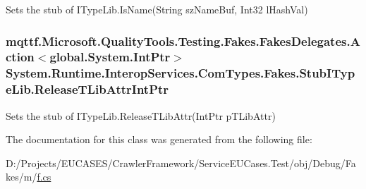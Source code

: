 Sets the stub of I\-Type\-Lib.\-Is\-Name(\-String sz\-Name\-Buf, Int32 l\-Hash\-Val)

\hypertarget{class_system_1_1_runtime_1_1_interop_services_1_1_com_types_1_1_fakes_1_1_stub_i_type_lib_a2ecc6b37cc0929152228151013834f4c}{
\subsubsection[{Release\-T\-Lib\-Attr\-Int\-Ptr}]{\setlength{\rightskip}{0pt plus 5cm}mqttf.\-Microsoft.\-Quality\-Tools.\-Testing.\-Fakes.\-Fakes\-Delegates.\-Action$<$global.\-System.\-Int\-Ptr$>$ System.\-Runtime.\-Interop\-Services.\-Com\-Types.\-Fakes.\-Stub\-I\-Type\-Lib.\-Release\-T\-Lib\-Attr\-Int\-Ptr}}\label{class_system_1_1_runtime_1_1_interop_services_1_1_com_types_1_1_fakes_1_1_stub_i_type_lib_a2ecc6b37cc0929152228151013834f4c}


Sets the stub of I\-Type\-Lib.\-Release\-T\-Lib\-Attr(\-Int\-Ptr p\-T\-Lib\-Attr)



The documentation for this class was generated from the following file\-:\begin{DoxyCompactItemize}
\item 
D\-:/\-Projects/\-E\-U\-C\-A\-S\-E\-S/\-Crawler\-Framework/\-Service\-E\-U\-Cases.\-Test/obj/\-Debug/\-Fakes/m/\hyperlink{m_2f_8cs}{f.\-cs}\end{DoxyCompactItemize}
